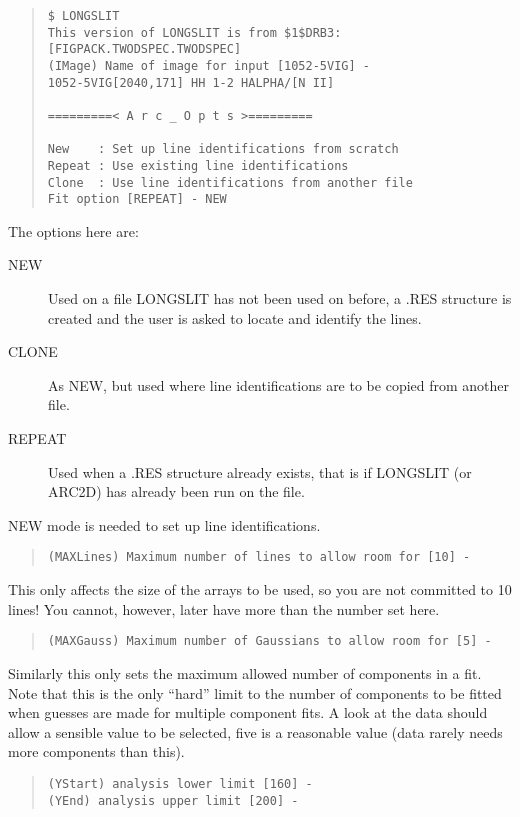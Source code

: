 \begin{quote}\begin{verbatim}
$ LONGSLIT
This version of LONGSLIT is from $1$DRB3:[FIGPACK.TWODSPEC.TWODSPEC]
(IMage) Name of image for input [1052-5VIG] -
1052-5VIG[2040,171] HH 1-2 HALPHA/[N II]

=========< A r c _ O p t s >=========

New    : Set up line identifications from scratch
Repeat : Use existing line identifications
Clone  : Use line identifications from another file
Fit option [REPEAT] - NEW
\end{verbatim}\end{quote}
The options here are:
\begin{description}
\item[NEW] Used on a file LONGSLIT has not been used on before, a
.RES structure is created and the user is asked to locate and identify
the lines.
\item[CLONE] As NEW, but used where line identifications are to be
copied from another file.
\item[REPEAT] Used when a .RES structure already exists, that is if
LONGSLIT (or ARC2D) has already been run on the file.
\end{description}
NEW mode is needed to set up line identifications.
\begin{quote}\begin{verbatim}
(MAXLines) Maximum number of lines to allow room for [10] -
\end{verbatim}\end{quote}
This only affects the size of the arrays to be used, so you are not
committed to 10 lines!
You cannot, however, later have more than the number set here.
\begin{quote}\begin{verbatim}
(MAXGauss) Maximum number of Gaussians to allow room for [5] -
\end{verbatim}\end{quote}
Similarly this only sets the maximum allowed number of components in a
fit.
Note that this is the only ``hard'' limit to the number of components to
be fitted when guesses are made for multiple component fits.
A look at the data should allow a sensible value to be selected, five is
a reasonable value (data rarely needs more components than this).
\begin{quote}\begin{verbatim}
(YStart) analysis lower limit [160] -
(YEnd) analysis upper limit [200] -
\end{verbatim}\end{quote}
